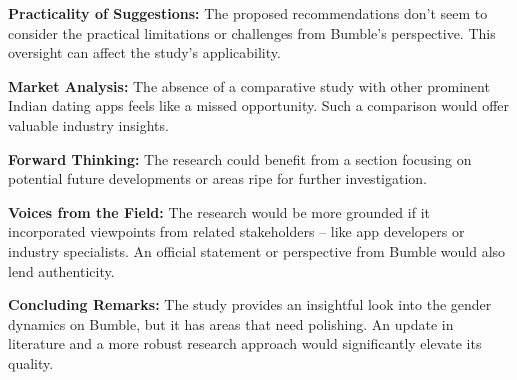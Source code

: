 \textbf{Practicality of Suggestions:} The proposed recommendations don't seem to consider the practical limitations or challenges from Bumble's perspective. This oversight can affect the study's applicability.

\textbf{Market Analysis:} The absence of a comparative study with other prominent Indian dating apps feels like a missed opportunity. Such a comparison would offer valuable industry insights.

\textbf{Forward Thinking:} The research could benefit from a section focusing on potential future developments or areas ripe for further investigation.

\textbf{Voices from the Field:} The research would be more grounded if it incorporated viewpoints from related stakeholders – like app developers or industry specialists. An official statement or perspective from Bumble would also lend authenticity.

\textbf{Concluding Remarks:} The study provides an insightful look into the gender dynamics on Bumble, but it has areas that need polishing. An update in literature and a more robust research approach would significantly elevate its quality.